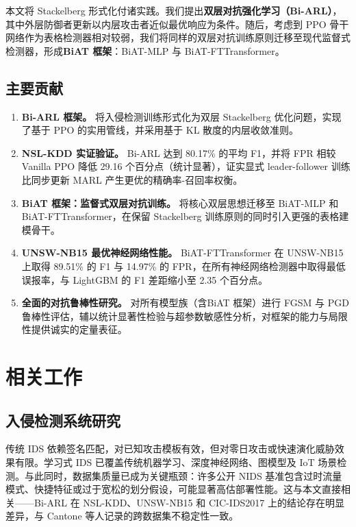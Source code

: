 \documentclass[12pt,a4paper]{ctexart}
\begin{document}
本文将 Stackelberg 形式化付诸实践。我们提出\textbf{双层对抗强化学习（Bi-ARL）}，其中外层防御者更新以内层攻击者近似最优响应为条件。随后，考虑到 PPO 骨干网络作为表格检测器相对较弱，我们将同样的双层对抗训练原则迁移至现代监督式检测器，形成\textbf{BiAT 框架}：BiAT-MLP 与 BiAT-FTTransformer。

\subsection{主要贡献}

\begin{enumerate}
    \item \textbf{Bi-ARL 框架。} 将入侵检测训练形式化为双层 Stackelberg 优化问题，实现了基于 PPO 的实用管线，并采用基于 KL 散度的内层收敛准则。

    \item \textbf{NSL-KDD 实证验证。} Bi-ARL 达到 80.17\% 的平均 F1，并将 FPR 相较 Vanilla PPO 降低 29.16 个百分点（统计显著），证实显式 leader-follower 训练比同步更新 MARL 产生更优的精确率-召回率权衡。

    \item \textbf{BiAT 框架：监督式双层对抗训练。} 将核心双层思想迁移至 BiAT-MLP 和 BiAT-FTTransformer，在保留 Stackelberg 训练原则的同时引入更强的表格建模骨干。

    \item \textbf{UNSW-NB15 最优神经网络性能。} BiAT-FTTransformer 在 UNSW-NB15 上取得 89.51\% 的 F1 与 14.97\% 的 FPR，在所有神经网络检测器中取得最低误报率，与 LightGBM 的 F1 差距缩小至 2.35 个百分点。

    \item \textbf{全面的对抗鲁棒性研究。} 对所有模型族（含BiAT 框架）进行 FGSM 与 PGD 鲁棒性评估，辅以统计显著性检验与超参数敏感性分析，对框架的能力与局限性提供诚实的定量表征。
\end{enumerate}

\section{相关工作}

\subsection{入侵检测系统研究}

传统 IDS 依赖签名匹配，对已知攻击模板有效，但对零日攻击或快速演化威胁效果有限。学习式 IDS 已覆盖传统机器学习、深度神经网络、图模型及 IoT 场景检测\cite{liao2024survey,moustafa2023explainable}。与此同时，数据集质量已成为关键瓶颈：许多公开 NIDS 基准包含过时流量模式、快捷特征或过于宽松的划分假设，可能显著高估部署性能\cite{ring2019nids,datasetreview2025}。这与本文直接相关——Bi-ARL 在 NSL-KDD、UNSW-NB15 和 CIC-IDS2017 上的结论存在明显差异，与 Cantone 等人记录的跨数据集不稳定性一致\cite{cantone2024crossdataset}。
\end{document}
